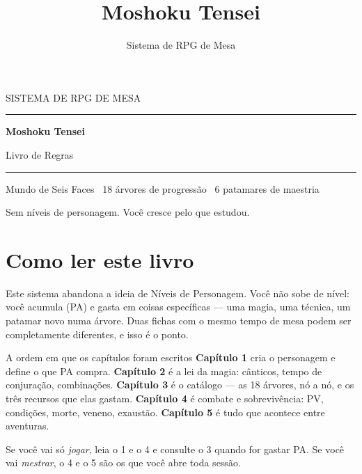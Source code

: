 \documentclass{moshoku}
\title{Moshoku Tensei}
\author{Sistema de RPG de Mesa}
\begin{document}
\begin{titlepage}
    \thispagestyle{empty}
    \centering
    \vspace*{\fill}
    {\displayfont\color{gold600}\Large SISTEMA DE RPG DE MESA\par}
    \vspace{10pt}
    {\color{gold300}\rule{0.45\linewidth}{1.2pt}\par}
    \vspace{22pt}
    {\displayfont\color{wine600}\fontsize{54}{60}\selectfont\bfseries Moshoku Tensei\par}
    \vspace{16pt}
    {\displayfont\color{parchment800}\LARGE Livro de Regras\par}
    \vspace{22pt}
    {\color{gold300}\rule{0.45\linewidth}{1.2pt}\par}
    \vspace{14pt}
    {\sffamily\color{parchment600}\small
     Mundo de Seis Faces \textbullet\ 18 árvores de progressão \textbullet\ 6 patamares de maestria\par}
    \vspace*{\fill}
    {\sffamily\footnotesize\color{parchment600}
     Sem níveis de personagem. Você cresce pelo que estudou.\par}
    \vspace{12pt}
\end{titlepage}

\frontmatter
\pagestyle{fancy}

\chapter*{Como ler este livro}

Este sistema abandona a ideia de Níveis de Personagem. Você não sobe de nível: você
acumula  (PA) e gasta em coisas específicas --- uma magia,
uma técnica, um patamar novo numa árvore. Duas fichas com o mesmo tempo de mesa podem
ser completamente diferentes, e isso é o ponto.

\begin{nota}{A ordem em que os capítulos foram escritos}
    \textbf{Capítulo 1} cria o personagem e define o que PA compra. \textbf{Capítulo 2}
    é a lei da magia: cânticos, tempo de conjuração, combinações. \textbf{Capítulo 3} é o
    catálogo --- as 18 árvores, nó a nó, e os três recursos que elas gastam.
    \textbf{Capítulo 4} é combate e sobrevivência: PV, condições, morte, veneno, exaustão.
    \textbf{Capítulo 5} é tudo que acontece entre aventuras.

    Se você vai só \emph{jogar}, leia o 1 e o 4 e consulte o 3 quando for gastar PA. Se
    você vai \emph{mestrar}, o 4 e o 5 são os que você abre toda sessão.
\end{nota}
\end{document}
